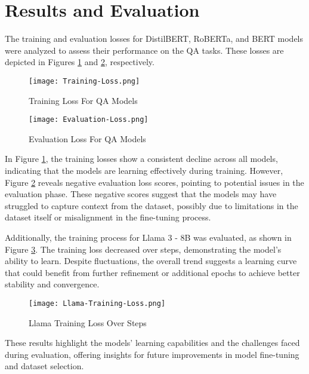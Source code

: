 \documentclass[conference]{IEEEtran}
\begin{document}
\section{Results and Evaluation}

The training and evaluation losses for DistilBERT, RoBERTa, and BERT models were analyzed to assess their performance on the QA tasks. These losses are depicted in Figures \ref{fig:training-loss-qa} and \ref{fig:evalutation-loss-qa}, respectively.
{\\}

\begin{figure}
    \centering
    \texttt{[image: Training-Loss.png]}
    \caption{Training Loss For QA Models}
    \label{fig:training-loss-qa}
\end{figure}

\begin{figure}
    \centering
    \texttt{[image: Evaluation-Loss.png]}
    \caption{Evaluation Loss For QA Models}
    \label{fig:evalutation-loss-qa}
\end{figure}

In Figure \ref{fig:training-loss-qa}, the training losses show a consistent decline across all models, indicating that the models are learning effectively during training. However, Figure \ref{fig:evalutation-loss-qa} reveals negative evaluation loss scores, pointing to potential issues in the evaluation phase. These negative scores suggest that the models may have struggled to capture context from the dataset, possibly due to limitations in the dataset itself or misalignment in the fine-tuning process.
{\\}

Additionally, the training process for Llama 3 - 8B was evaluated, as shown in Figure \ref{fig:llama-training-loss}. The training loss decreased over steps, demonstrating the model's ability to learn. Despite fluctuations, the overall trend suggests a learning curve that could benefit from further refinement or additional epochs to achieve better stability and convergence.

\begin{figure}
    \centering
    \texttt{[image: Llama-Training-Loss.png]}
    \caption{Llama Training Loss Over Steps}
    \label{fig:llama-training-loss}
\end{figure}

These results highlight the models' learning capabilities and the challenges faced during evaluation, offering insights for future improvements in model fine-tuning and dataset selection.
\end{document}
